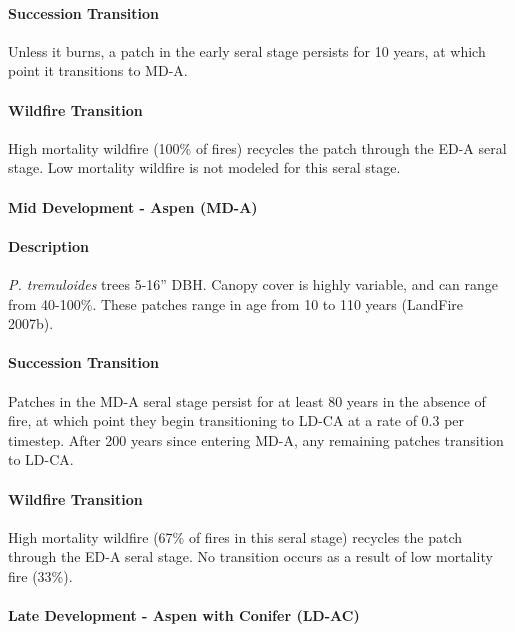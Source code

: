 \paragraph*{Succession Transition} Unless it burns, a patch in the early seral stage persists for 10 years, at which point it transitions to MD-A.

\paragraph*{Wildfire Transition} High mortality wildfire (100\% of fires) recycles the patch through the ED-A seral stage. Low mortality wildfire is not modeled for this seral stage.

\noindent\hrulefill


\paragraph*{Mid Development - Aspen (MD-A)}

\paragraph*{Description} \emph{P. tremuloides} trees 5-16'' DBH. Canopy cover is highly variable, and can range from 40-100\%. These patches range in age from 10 to 110 years (LandFire 2007b).

\paragraph*{Succession Transition} Patches in the MD-A seral stage persist for at least 80 years in the absence of fire, at which point they begin transitioning to LD-CA at a rate of 0.3 per timestep. After 200 years since entering MD-A, any remaining patches transition to LD-CA. 

\paragraph*{Wildfire Transition} High mortality wildfire (67\% of fires in this seral stage) recycles the patch through the ED-A seral stage. No transition occurs as a result of low mortality fire (33\%).

\noindent\hrulefill



\paragraph*{Late Development - Aspen with Conifer (LD-AC)}

